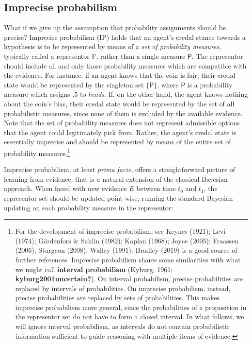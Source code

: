 \documentclass[
  letterpaper,
  DIV=11,
  numbers=noendperiod]{scrartcl}
\begin{document}
\hypertarget{imprecise-probabilism}{%
\subsection{Imprecise probabilism}\label{imprecise-probabilism}}

What if we give up the assumption that probability assignments should be
precise? Imprecise probabilism (\textsf{IP}) holds that an agent's
credal stance towards a hypothesis is to be represented by means of a
\emph{set of probability measures}, typically called a representor
\(\mathbb{P}\), rather than a single measure \(\mathsf{P}\). The
representor should include all and only those probability measures which
are compatible with the evidence. For instance, if an agent knows that
the coin is fair, their credal state would be represented by the
singleton set \(\{\mathsf{P}\}\), where \(\mathsf{P}\) is a probability
measure which assigns \(.5\) to \emph{heads}. If, on the other hand, the
agent knows nothing about the coin's bias, their credal state would be
represented by the set of all probabilistic measures, since none of them
is excluded by the available evidence. Note that the set of probability
measures does not represent admissible options that the agent could
legitimately pick from. Rather, the agent's credal state is essentially
imprecise and should be represented by means of the entire set of
probability measures.\footnote{For the development of imprecise
  probabilism, see Keynes (1921); Levi (1974); Gärdenfors \& Sahlin
  (1982); Kaplan (1968); Joyce (2005); Fraassen (2006); Sturgeon (2008);
  Walley (1991). Bradley (2019) is a good source of further references.
  Imprecise probabilism shares some similarities with what we might call
  \textbf{interval probabilism} (Kyburg, 1961;
  \textbf{kyburg2001uncertain?}). On interval probabilism, precise
  probabilities are replaced by intervals of probabilities. On imprecise
  probabilism, instead, precise probabilities are replaced by sets of
  probabilities. This makes imprecise probabilism more general, since
  the probabilities of a proposition in the representor set do not have
  to form a closed interval. In what follows, we will ignore interval
  probabilism, as intervals do not contain probabilistic information
  sufficient to guide reasoning with multiple items of evidence.}

Imprecise probabilism, at least \emph{prima facie}, offers a
straightforward picture of learning from evidence, that is a natural
extension of the classical Bayesian approach. When faced with new
evidence \(E\) between time \(t_0\) and \(t_1\), the representor set
should be updated point-wise, running the standard Bayesian updating on
each probability measure in the representor:
\end{document}
